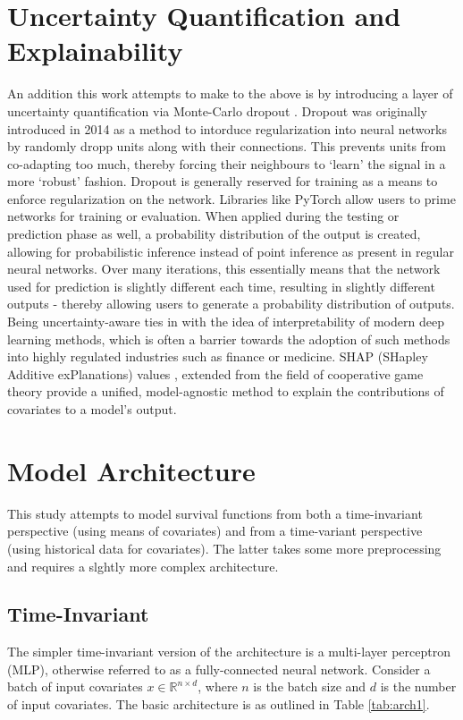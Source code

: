 \documentclass[%
 reprint,
 amsmath,amssymb,
 aps,nofootinbib
]{revtex4-2}
\begin{document}
\section{\label{UQ_explain}Uncertainty Quantification and Explainability}
An addition this work attempts to make to the above is by introducing a layer of uncertainty quantification via Monte-Carlo dropout \cite{mcdropout}. Dropout was originally introduced in 2014 \cite{dropout} as a method to intorduce regularization into neural networks by randomly dropp units along with their connections. This prevents units from co-adapting too much, thereby forcing their neighbours to `learn' the signal in a more `robust' fashion. Dropout is generally reserved for training as a means to enforce regularization on the network. Libraries like PyTorch allow users to prime networks for training or evaluation. When applied during the testing or prediction phase as well, a probability distribution of the output is created, allowing for probabilistic inference instead of point inference as present in regular neural networks. Over many iterations, this essentially means that the network used for prediction is slightly different each time, resulting in slightly different outputs - thereby allowing users to generate a probability distribution of outputs.\\

Being uncertainty-aware ties in with the idea of interpretability of modern deep learning methods, which is often a barrier towards the adoption of such methods into highly regulated industries such as finance or medicine. SHAP (SHapley Additive exPlanations) values \cite{shap}, extended from the field of cooperative game theory provide a unified, model-agnostic method to explain the contributions of covariates to a model's output.

\section{\label{model_arch}Model Architecture}
This study attempts to model survival functions from both a time-invariant perspective (using means of covariates) and from a time-variant perspective (using historical data for covariates). The latter takes some more preprocessing and requires a slghtly more complex architecture.

\subsection{\label{time_invar_arch}Time-Invariant}
The simpler time-invariant version of the architecture is a multi-layer perceptron (MLP), otherwise referred to as a fully-connected neural network. Consider a batch of input covariates $x \in \mathbb{R}^{n\times d}$, where $n$ is the batch size and $d$ is the number of input covariates. The basic architecture is as outlined in Table \ref{tab:arch1}.\\
\end{document}

